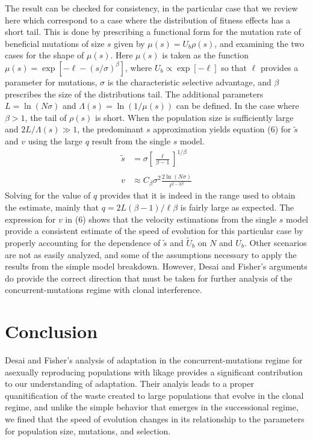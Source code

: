 \documentclass[12pt, one column]{article}
\begin{document}
The result can be checked for consistency, in the particular case that we review here which correspond to a case where the distribution of fitness effects has a short tail.  This is done by prescribing a functional form for the mutation rate of beneficial mutations of size $s$ given by $\mu(s)=U_b \rho(s)$, and examining the two cases for the shape of $\mu(s)$.  Here $\mu(s)$ is taken as the function $\mu(s) = \exp[-\ell - (s/\sigma)^\beta]$, where $U_b \propto \exp[-\ell]$ so that $\ell$ provides a parameter for mutations, $\sigma$ is the characteristic selective advantage, and $\beta $ prescribes the size of the distributions tail.  The additional parameters $L=\ln(N\sigma)$ and $\Lambda(s)= \ln(1/\mu(s))$ can be defined.  In the case where $\beta > 1$, the tail of $\rho(s)$ is short.  When the population size is sufficiently large and $2L/\Lambda(s)\gg 1$, the predominant $s$ approximation yields equation (6) for $\tilde{s}$ and $v$ using the large $q$ result from the single $s$ model.
\begin{equation}
\begin{aligned}
\tilde{s} &= \sigma\left[ \frac{\ell}{\beta-1} \right]^{1/\beta}\\
\\
v & \approx C_\beta \sigma^2 \frac{2 \ln(N\sigma)}{\ell^{2-2\beta}}
\end{aligned}
\end{equation}
Solving for the value of $q$ provides that it is indeed in the range used to obtain the estimate, mainly that $q=2L(\beta-1)/\ell \beta$ is fairly large as expected.  The expression for $v$ in (6) shows that the velocity estimations from the single $s$ model provide a consistent estimate of the speed of evolution for this particular case by properly accounting for the dependence of $\tilde{s}$ and $\tilde{U}_b$ on $N$ and $U_b$.  Other scenarios are not as easily analyzed, and some of the assumptions necessary to apply the results from the simple model breakdown. However, Desai and Fisher's arguments do provide the correct direction that must be taken for further analysis of the concurrent-mutations regime with clonal interference.

\section*{Conclusion}
Desai and Fisher's analysis of adaptation in the concurrent-mutations regime for asexually reproducing populations with likage provides a significant contribution to our understanding of adaptation.  Their analyis leads to a proper quanitification of the waste created to large populations that evolve in the clonal regime, and unlike the simple behavior that emerges in the successional regime, we fined that the speed of evolution changes in its relationship to the parameters for population size, mutations, and selection.
\end{document}
